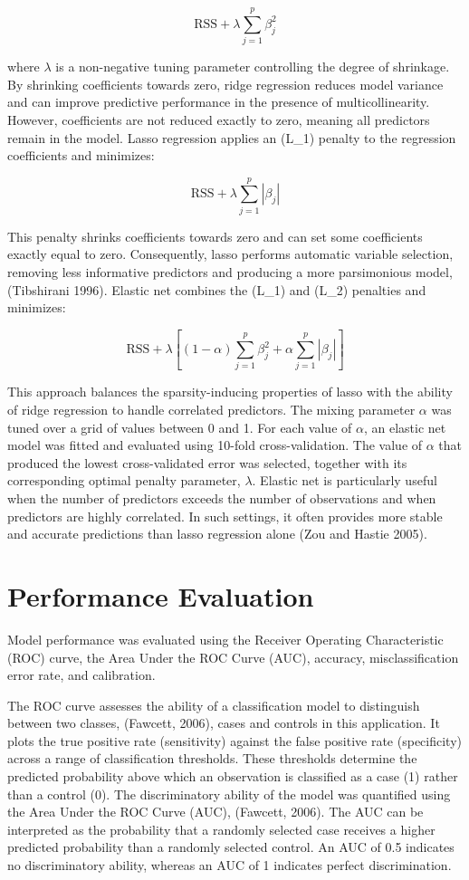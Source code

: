 \documentclass{article}
\begin{document}
\[\mathrm{RSS} + \lambda \sum_{j=1}^{p}\beta_j^2\]

where \(\lambda\) is a non-negative tuning parameter controlling the
degree of shrinkage. By shrinking coefficients towards zero, ridge
regression reduces model variance and can improve predictive performance
in the presence of multicollinearity. However, coefficients are not
reduced exactly to zero, meaning all predictors remain in the model.
Lasso regression applies an (L\_1) penalty to the regression
coefficients and minimizes:

\[\mathrm{RSS} + \lambda \sum_{j=1}^{p}|\beta_j|\]

This penalty shrinks coefficients towards zero and can set some
coefficients exactly equal to zero. Consequently, lasso performs
automatic variable selection, removing less informative predictors and
producing a more parsimonious model, (Tibshirani 1996). Elastic net
combines the (L\_1) and (L\_2) penalties and minimizes:

\[\mathrm{RSS} + \lambda \left[(1-\alpha)\sum_{j=1}^{p}\beta_j^2 + \alpha\sum_{j=1}^{p}|\beta_j|\right]\]

This approach balances the sparsity-inducing properties of lasso with
the ability of ridge regression to handle correlated predictors. The
mixing parameter \(\alpha\) was tuned over a grid of values between 0
and 1. For each value of \(\alpha\), an elastic net model was fitted and
evaluated using 10-fold cross-validation. The value of \(\alpha\) that
produced the lowest cross-validated error was selected, together with
its corresponding optimal penalty parameter, \(\lambda\). Elastic net is
particularly useful when the number of predictors exceeds the number of
observations and when predictors are highly correlated. In such
settings, it often provides more stable and accurate predictions than
lasso regression alone (Zou and Hastie 2005).

\section{Performance Evaluation}\label{performance-evaluation}

Model performance was evaluated using the Receiver Operating
Characteristic (ROC) curve, the Area Under the ROC Curve (AUC),
accuracy, misclassification error rate, and calibration.

The ROC curve assesses the ability of a classification model to
distinguish between two classes, (Fawcett, 2006), cases and controls in
this application. It plots the true positive rate (sensitivity) against
the false positive rate (specificity) across a range of classification
thresholds. These thresholds determine the predicted probability above
which an observation is classified as a case (1) rather than a control
(0). The discriminatory ability of the model was quantified using the
Area Under the ROC Curve (AUC), (Fawcett, 2006). The AUC can be
interpreted as the probability that a randomly selected case receives a
higher predicted probability than a randomly selected control. An AUC of
0.5 indicates no discriminatory ability, whereas an AUC of 1 indicates
perfect discrimination.
\end{document}
